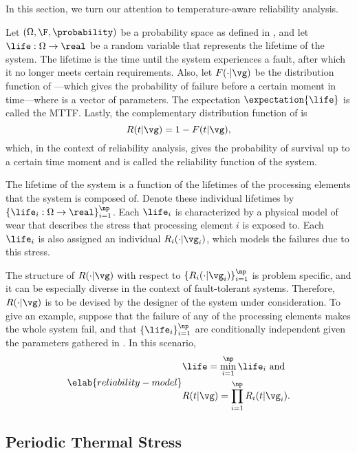 In this section, we turn our attention to temperature-aware reliability
analysis.

Let $(\Omega, \F, \probability)$ be a probability space as defined in
, and let $\life: \Omega \to \real$ be a random
variable that represents the lifetime of the system. The lifetime is the time
until the system experiences a fault, after which it no longer meets certain
requirements. Also, let $F(\cdot | \vg)$ be the distribution function of
\life---which gives the probability of failure before a certain moment in
time---where \vg is a vector of parameters. The expectation
$\expectation{\life}$ is called the \ac{MTTF}. Lastly, the complementary
distribution function of \life is
\[
  R(t | \vg) = 1 - F(t | \vg),
\]
which, in the context of reliability analysis, gives the probability of survival
up to a certain time moment and is called the reliability function of the
system.

The lifetime \life of the system is a function of the lifetimes of the \np
processing elements that the system is composed of. Denote these individual
lifetimes by $\{ \life_i: \Omega \to \real \}_{i = 1}^\np$. Each $\life_i$ is
characterized by a physical model of wear \cite{jedec2016} that describes the
stress that processing element $i$ is exposed to. Each $\life_i$ is also
assigned an individual $R_i(\cdot | \vg_i)$, which models the failures due to
this stress.

The structure of $R(\cdot | \vg)$ with respect to $\{ R_i(\cdot | \vg_i) \}_{i =
1}^\np$ is problem specific, and it can be especially diverse in the context of
fault-tolerant systems. Therefore, $R(\cdot | \vg)$ is to be devised by the
designer of the system under consideration. To give an example, suppose that the
failure of any of the \np processing elements makes the whole system fail, and
that $\{ \life_i \}_{i = 1}^\np$ are conditionally independent given the
parameters gathered in \vg. In this scenario,
\begin{equation} \elab{reliability-model}
  \begin{split}
    & \life = \min_{i = 1}^\np \life_i \text{ and} \\
    & R(t | \vg) = \prod_{i = 1}^\np R_i(t | \vg_i).
  \end{split}
\end{equation}

\subsection{Periodic Thermal Stress}


